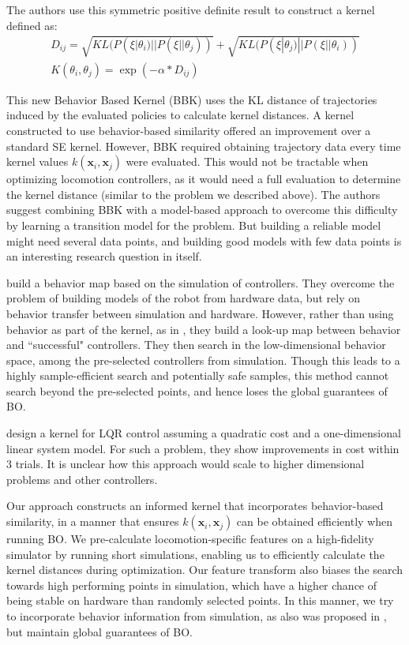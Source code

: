 The authors use this symmetric positive definite result to construct a kernel defined as:
\begin{align}
D_{ij} = \sqrt{KL(P(\xi|\theta_i)||P(\xi || \theta_j))} + \sqrt{ KL(P(\xi|\theta_j)||P(\xi || \theta_i))} \\
K(\theta_i, \theta_j) = \exp(-\alpha * D_{ij})
\end{align}

This new Behavior Based Kernel (BBK) uses the KL distance of trajectories induced by the evaluated policies to calculate kernel distances. A kernel constructed to use behavior-based similarity offered an improvement over a standard SE kernel. However, BBK required obtaining trajectory data every time kernel values $k(\pmb{x}_i, \pmb{x}_j)$ were evaluated. This would not be tractable when optimizing locomotion controllers, as it would need a full evaluation to determine the kernel distance (similar to the problem we described above). The authors suggest combining BBK with a model-based approach to overcome this difficulty by learning a transition model for the problem. But building a reliable model might need several data points, and building good models with few data points is an interesting research question in itself.

\cite{cully2015robots} build a behavior map based on the simulation of controllers. They overcome the problem of building models of the robot from hardware data, but rely on behavior transfer between simulation and hardware. However, rather than using behavior as part of the kernel, as in \cite{wilson2014using}, they build a look-up map between behavior and ``successful" controllers. They then search in the low-dimensional behavior space, among the pre-selected controllers from simulation. Though this leads to a highly sample-efficient search and potentially safe samples, this method cannot search beyond the pre-selected points, and hence loses the global guarantees of BO.

\cite{marco2017design} design a kernel for LQR control assuming a quadratic cost and a one-dimensional linear system model. For such a problem, they show improvements in cost within 3 trials. It is unclear how this approach would scale to higher dimensional problems and other controllers.

Our approach constructs an informed kernel that incorporates behavior-based similarity, in a manner that ensures $k(\pmb{x}_i, \pmb{x}_j)$ can be obtained efficiently when running BO. We pre-calculate locomotion-specific features on a high-fidelity simulator by running short simulations, enabling us to efficiently calculate the kernel distances during optimization. Our feature transform also biases the search towards high performing points in simulation, which have a higher chance of being stable on hardware than randomly selected points. In this manner, we try to incorporate behavior information from simulation, as also was proposed in \cite{cully2015robots}, but maintain global guarantees of BO.



